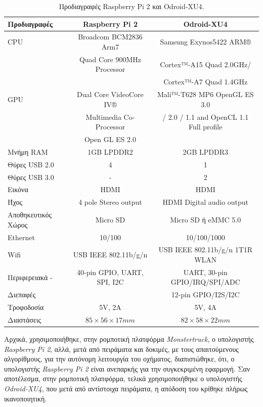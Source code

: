 \bigskip
\begin{table}[!ht]
	\centering
	\caption{Προδιαγραφές Raspberry Pi 2 και Odroid-XU4.}
	\begin{tabular}{| l | c | c |}
   		\hline
	   \textbf{Προδιαγραφές} & \textbf{Raspberry Pi 2} & \textbf{Odroid-XU4} \\ \hline
	   	CPU & Broadcom BCM2836 Arm7 & Samsung Exynos5422 ARM® \\ &Quad Core 900MHz Processor & Cortex™-A15 Quad 2.0GHz/\\ & & Cortex™-A7 Quad 1.4GHz\\ \hline
		GPU & Dual Core VideoCore IV® & Mali™-T628 MP6 OpenGL ES 3.0\\
		& Multimedia Co-Processor & / 2.0 / 1.1 and OpenCL 1.1 Full profile\\ 
		&  Open GL ES 2.0 &\\ \hline		   
	   Μνήμη RAM & 1GB LPDDR2 & 2GB LPDDR3 \\ \hline
	   Θύρες USB 2.0 & 4 & 1\\ \hline
	   Θύρες USB 3.0 & - & 2\\ \hline
	   Εικόνα & HDMI & HDMI\\ \hline
	   Ήχος & 4 pole Stereo output & HDMI Digital audio output\\ \hline
	   Αποθηκευτικός Χώρος & Micro SD & Micro SD ή eMMC 5.0\\ \hline
	   Ethernet & 10/100 & 10/100/1000\\ \hline
	  	Wifi & USB IEEE 802.11b/g/n & USB IEEE 802.11b/g/n 1T1R WLAN\\ \hline
	  	Περιφερειακά - & 40-pin GPIO, UART, SPI, I2C & UART, 30-pin GPIO/IRQ/SPI/ADC\\
	  	Διεπαφές & & 12-pin GPIO/I2S/I2C \\ \hline
	  	Τροφοδοσία & 5V, 2A & 5V, 4A\\ \hline
	   Διαστάσεις & $85 \times 56 \times 17 mm$ & $82 \times 58 \times 22 mm$\\\hline
   \end{tabular}
	\label{tab:computer_specs}
\end{table}

\newpage
Αρχικά, χρησιμοποιήθηκε, στην ρομποτική πλατφόρμα \textit{Monstertruck}, ο υπολογιστής \textit{Raspberry Pi 2}, αλλά, μετά από πειράματα και δοκιμές, με τους απαιτούμενους αλγορίθμους, για την αυτόνομη λειτουργία του οχήματος, διαπιστώθηκε, ότι, ο υπολογιστής \textit{Raspberry Pi 2}  είναι ανεπαρκής για την συγκεκριμένη εφαρμογή. Σαν αποτέλεσμα, στην ρομποτική πλατφόρμα, τελικά χρησιμοποιήθηκε ο υπολογιστής \textit{Odroid-XU4}, που μετά από αντίστοιχα πειράματα, η απόδοση του κρίθηκε πλήρως ικανοποιητική.

